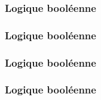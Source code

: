 \subsubsection{Logique booléenne}




\subsubsection{Logique booléenne}




\subsubsection{Logique booléenne}




\subsubsection{Logique booléenne}